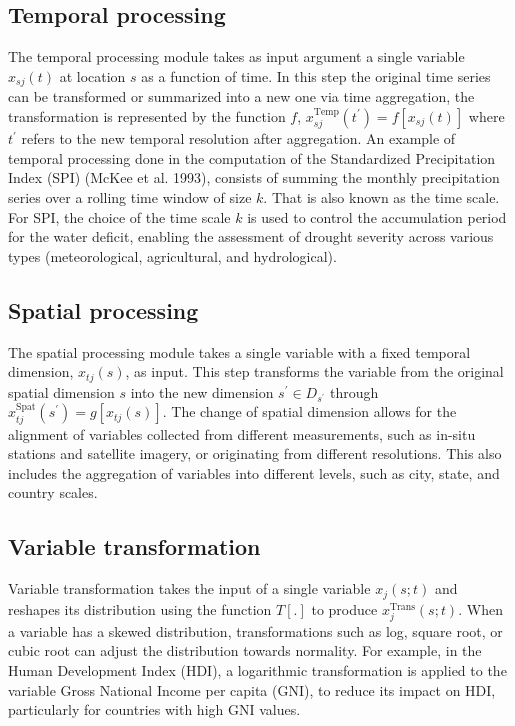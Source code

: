 \documentclass[
]{interact}
\begin{document}
\hypertarget{temporal-processing}{%
\subsection{Temporal processing}\label{temporal-processing}}

The temporal processing module takes as input argument a single variable
\(x_{sj}(t)\) at location \(s\) as a function of time. In this step the
original time series can be transformed or summarized into a new one via
time aggregation, the transformation is represented by the function
\(f\), \(x^{\text{Temp}}_{sj}(t^\prime) = f[x_{sj}(t)]\) where
\(t^\prime\) refers to the new temporal resolution after aggregation. An
example of temporal processing done in the computation of the
Standardized Precipitation Index (SPI) (McKee et al. 1993), consists of
summing the monthly precipitation series over a rolling time window of
size \(k\). That is also known as the time scale. For SPI, the choice of
the time scale \(k\) is used to control the accumulation period for the
water deficit, enabling the assessment of drought severity across
various types (meteorological, agricultural, and hydrological).

\hypertarget{spatial-processing}{%
\subsection{Spatial processing}\label{spatial-processing}}

The spatial processing module takes a single variable with a fixed
temporal dimension, \(x_{tj}(s)\), as input. This step transforms the
variable from the original spatial dimension \(s\) into the new
dimension \(s^\prime \in D_{s^\prime}\) through
\(x^{\text{Spat}}_{tj}(s^\prime) = g[x_{tj}(s)]\). The change of spatial
dimension allows for the alignment of variables collected from different
measurements, such as in-situ stations and satellite imagery, or
originating from different resolutions. This also includes the
aggregation of variables into different levels, such as city, state, and
country scales.

\hypertarget{variable-transformation}{%
\subsection{Variable transformation}\label{variable-transformation}}

Variable transformation takes the input of a single variable
\(x_j(s;t)\) and reshapes its distribution using the function \(T[.]\)
to produce \(x^{\text{Trans}}_{j}(s;t)\). When a variable has a skewed
distribution, transformations such as log, square root, or cubic root
can adjust the distribution towards normality. For example, in the Human
Development Index (HDI), a logarithmic transformation is applied to the
variable Gross National Income per capita (GNI), to reduce its impact on
HDI, particularly for countries with high GNI values.
\end{document}
